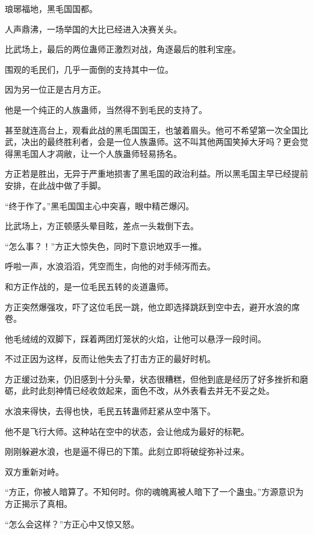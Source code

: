 
\begin{this_body}

琅琊福地，黑毛国国都。

人声鼎沸，一场举国的大比已经进入决赛关头。

比武场上，最后的两位蛊师正激烈对战，角逐最后的胜利宝座。

围观的毛民们，几乎一面倒的支持其中一位。

因为另一位正是古月方正。

他是一个纯正的人族蛊师，当然得不到毛民的支持了。

甚至就连高台上，观看此战的黑毛国国王，也皱着眉头。他可不希望第一次全国比武，决出的最终胜利者，会是一位人族蛊师。这不叫其他两国笑掉大牙吗？更会觉得黑毛国人才凋敝，让一个人族蛊师轻易扬名。

方正若是胜出，无异于严重地损害了黑毛国的政治利益。所以黑毛国主早已经提前安排，在此战中做了手脚。

“终于作了。”黑毛国国主心中突喜，眼中精芒爆闪。

比武场上，方正顿感头晕目眩，差点一头栽倒下去。

“怎么事？！”方正大惊失色，同时下意识地双手一推。

呼啦一声，水浪滔滔，凭空而生，向他的对手倾泻而去。

和方正作战的，是一位毛民五转的炎道蛊师。

方正突然爆强攻，吓了这位毛民一跳，他立即选择跳跃到空中去，避开水浪的席卷。

他毛绒绒的双脚下，踩着两团灯笼状的火焰，让他可以悬浮一段时间。

不过正因为这样，反而让他失去了打击方正的最好时机。

方正缓过劲来，仍旧感到十分头晕，状态很糟糕，但他到底是经历了好多挫折和磨砺，此时此刻神情已经收敛起来，面色不改，从外表看去并无不妥之处。

水浪来得快，去得也快，毛民五转蛊师赶紧从空中落下。

他不是飞行大师。这种站在空中的状态，会让他成为最好的标靶。

刚刚躲避水浪，也是逼不得已的下策。此刻立即将破绽弥补过来。

双方重新对峙。

“方正，你被人暗算了。不知何时。你的魂魄离被人暗下了一个蛊虫。”方源意识为方正揭示了真相。

“怎么会这样？”方正心中又惊又怒。


\end{this_body}
